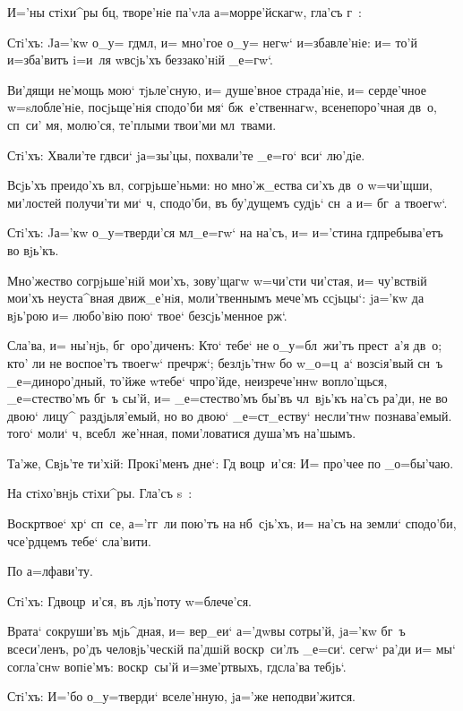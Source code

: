 И='ны стiхи^ры бц, творе'нiе па'vла 
а=морре'йскагw, гла'съ г~: 

Стi'хъ: Jа='кw о_у= гд мл, и= мно'гое о_у= 
негw` и=збавле'нiе: и= то'й и=зба'витъ i=и~ля w\т всjь'хъ 
беззако'нiй _е=гw`.

Ви'дящи не'мощь мою` тjьле'сную, и= душе'вное 
страда'нiе, и= серде'чное w=sлобле'нiе, посjьще'нiя 
сподо'би мя` бж~е'ственнагw, всенепоро'чная дв~о, сп~си' 
мя, молю'ся, те'плыми твои'ми мл~твами.

Стi'хъ: Хвали'те гд вси` jа=зы'цы, похвали'те 
_е=го` вси` лю'дiе. 

Всjь'хъ преидо'хъ вл, согрjьше'ньми: но 
мно'ж_ества си'хъ дв~о w=чи'щши, ми'лостей получи'ти ми` 
ч, сподо'би, въ бу'дущемъ судjь` сн~а и= бг~а 
твоегw`. 

Стi'хъ: Jа='кw о_у=тверди'ся мл _е=гw` на на'съ, 
и= и='стина гд пребыва'етъ во вjь'къ.

Мно'жество согрjьше'нiй мои'хъ, зову'щагw w=чи'сти 
чи'стая, и= чу'вствiй мои'хъ неуста^вная движ_е'нiя, 
моли'твеннымъ мече'мъ ссjьцы`: jа='кw да вjь'рою и= 
любо'вiю пою` твое` безсjь'менное рж`.

Сла'ва, и= ны'нjь, бг~оро'диченъ: Кто` тебе` не 
о_у=бл~жи'тъ прест~а'я дв~о; кто' ли не воспое'тъ твоегw` 
преч рж`; безлjь'тнw бо w\т _о=ц~а` возсiя'вый 
сн~ъ _е=диноро'дный, то'йже w\т тебе` ч про'йде, 
неизрече'ннw вопло'щься, _е=стество'мъ бг~ъ сы'й, и= 
_е=стество'мъ бы'въ чл~вjь'къ на'съ ра'ди, не во двою` 
лицу^ раздjьля'емый, но во двою` _е=ст_еству` несли'тнw 
познава'емый. того` моли` ч, всебл~же'нная, 
поми'ловатися душа'мъ на'шымъ.

Та'же, Свjь'те ти'хiй: Прокi'менъ дне`: Гд 
воцр~и'ся: И= про'чее по _о=бы'чаю. 

На стiхо'внjь стiхи^ры. Гла'съ s~:

Воскр твое` хр` сп~се, а='гг~ли пою'тъ на 
нб~сjь'хъ, и= на'съ на земли` сподо'би, ч се'рдцемъ 
тебе` сла'вити.

По а=лфави'ту.

Стi'хъ: Гд воцр~и'ся, въ лjь'поту w=блече'ся. 

Врата` сокруши'въ мjь^дная, и= вер_еи` а='дwвы 
сотры'й, jа='кw бг~ъ всеси'ленъ, ро'дъ человjь'ческiй 
па'дшiй воскр~си'лъ _е=си`. сегw` ра'ди и= мы` согла'снw 
вопiе'мъ: воскр~сы'й и=з\ъ ме'ртвыхъ, гд сла'ва 
тебjь`.

Стi'хъ: И='бо о_у=тверди` вселе'нную, jа='же 
неподви'жится. 

